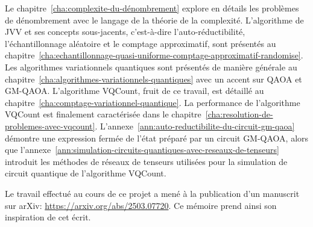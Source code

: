 Le chapitre~\ref{cha:complexite-du-dénombrement} explore en détails les problèmes de dénombrement avec le langage de la théorie de la complexité. L'algorithme de JVV et ses concepts sous-jacents, c'est-à-dire l'auto-réductibilité, l'échantillonnage aléatoire et le comptage approximatif, sont présentés au chapitre~\ref{cha:echantillonnage-quasi-uniforme-comptage-approximatif-randomise}. Les algorithmes variationnels quantiques sont présentés de manière générale au chapitre~\ref{cha:algorithmes-variationnels-quantiques} avec un accent sur QAOA et GM-QAOA. L'algorithme VQCount, fruit de ce travail, est détaillé au chapitre~\ref{cha:comptage-variationnel-quantique}. La performance de l'algorithme VQCount est finalement caractérisée dans le chapitre~\ref{cha:resolution-de-problemes-avec-vqcount}. L'annexe~\ref{ann:auto-reductibilite-du-circuit-gm-qaoa} démontre une expression fermée de l'état préparé par un circuit GM-QAOA, alors que l'annexe~\ref{ann:simulation-circuits-quantiques-avec-reseaux-de-tenseurs} introduit les méthodes de réseaux de tenseurs utilisées pour la simulation de circuit quantique de l'algorithme VQCount.

Le travail effectué au cours de ce projet a mené à la publication d'un manuscrit sur arXiv: \url{https://arxiv.org/abs/2503.07720}. Ce mémoire prend ainsi son inspiration de cet écrit.